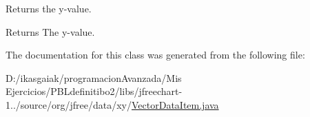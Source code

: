 Returns the y-\/value.

\begin{DoxyReturn}{Returns}
The y-\/value. 
\end{DoxyReturn}


The documentation for this class was generated from the following file\+:\begin{DoxyCompactItemize}
\item 
D\+:/ikasgaiak/programacion\+Avanzada/\+Mis Ejercicios/\+P\+B\+Ldefinitibo2/libs/jfreechart-\/1../source/org/jfree/data/xy/\mbox{\hyperlink{_vector_data_item_8java}{Vector\+Data\+Item.\+java}}\end{DoxyCompactItemize}
